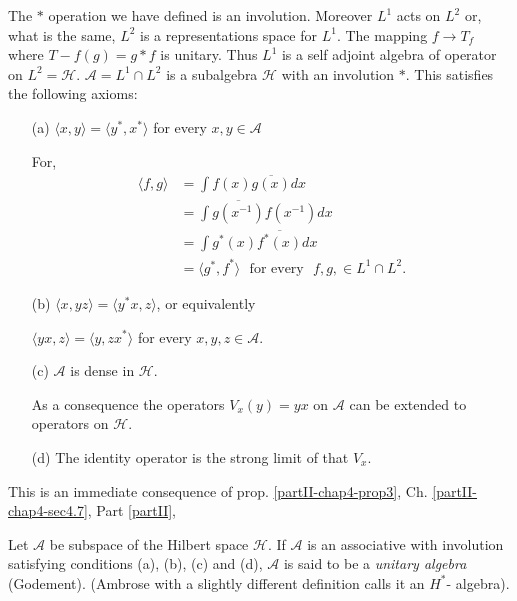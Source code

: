 The  $*$ operation we have defined is an involution. Moreover $L^1$ acts
on $L^2$ or, what is the same, $L^2$ is a representations space for
$L^1$. The mapping $f\rightarrow T_f$  where $T-f(g)=g*f$ is
unitary. Thus $L^1$ is a self adjoint algebra of operator on
$L^2=\mathscr{H}$. $\mathcal{A}=L^1 \cap L^2$  is a subalgebra
$\mathscr{H}$ with an involution $*$. This satisfies the following
axioms:
\begin{itemize} 
\item[(a)] $\langle x,y \rangle   = \langle y^*,x^* \rangle$ for every
$x,y \in \mathcal{A}$

For,
\begin{align*}
\langle f,g \rangle  & = \int f(x)\overline{g(x)} dx\\
& = \int \overline{g(x^{-1})}f(x^{-1})dx\\
& = \int g^*(x) \overline{f^*(x)}dx\\
& = \langle g^*,f^*\rangle \text {~ for every~ }  f,g,\in L^1 \cap L^2.
\end{align*}

\item[(b)] $\langle x, yz \rangle  = \langle y^*x,z\rangle$,  or
  equivalently
 
$\langle yx,z\rangle  = \langle y,zx^* \rangle$  for every $x,y,z
\in \mathcal{A}$. 


\item[(c)] $\mathcal{A}$  is dense  in $\mathscr{H}$.

As a  consequence the operators  $V_x(y) = yx $  on  $\mathcal{A}$
can be extended to operators on $ \mathscr{H}$. 

\item[(d)] The identity operator is the strong limit of that $V_x$.
\end{itemize}

This is an immediate consequence of prop. \ref{partII-chap4-prop3},
Ch. \ref{partII-chap4-sec4.7}, Part \ref{partII}, 

\begin{defi*}%
 Let $\mathcal{A}$ be subspace of the  Hilbert space $\mathscr{H}$. If
 $\mathcal{A}$ is an associative with involution satisfying conditions
 (a), (b), (c) and (d),  $\mathcal{A}$ is said to be a {\em unitary
   algebra} (Godement). (Ambrose with a slightly different definition
 calls it an $H^*$- algebra). 
\end{defi*}

\subsection{}\label{partIII-chap3-sec3.2}\pageoriginale%

